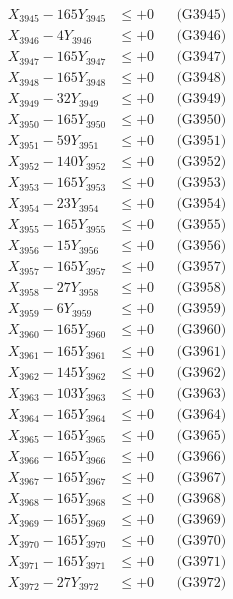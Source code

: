 \documentclass[a4paper,10pt]{article}
\begin{document}
{\begin{align}
X_{3945} - 165Y_{3945} &\leq +0 && \text{(G3945)} \\
X_{3946} - 4Y_{3946} &\leq +0 && \text{(G3946)} \\
X_{3947} - 165Y_{3947} &\leq +0 && \text{(G3947)} \\
X_{3948} - 165Y_{3948} &\leq +0 && \text{(G3948)} \\
X_{3949} - 32Y_{3949} &\leq +0 && \text{(G3949)} \\
X_{3950} - 165Y_{3950} &\leq +0 && \text{(G3950)} \\
\allowbreak
X_{3951} - 59Y_{3951} &\leq +0 && \text{(G3951)} \\
X_{3952} - 140Y_{3952} &\leq +0 && \text{(G3952)} \\
X_{3953} - 165Y_{3953} &\leq +0 && \text{(G3953)} \\
X_{3954} - 23Y_{3954} &\leq +0 && \text{(G3954)} \\
X_{3955} - 165Y_{3955} &\leq +0 && \text{(G3955)} \\
X_{3956} - 15Y_{3956} &\leq +0 && \text{(G3956)} \\
X_{3957} - 165Y_{3957} &\leq +0 && \text{(G3957)} \\
X_{3958} - 27Y_{3958} &\leq +0 && \text{(G3958)} \\
X_{3959} - 6Y_{3959} &\leq +0 && \text{(G3959)} \\
X_{3960} - 165Y_{3960} &\leq +0 && \text{(G3960)} \\
\allowbreak
X_{3961} - 165Y_{3961} &\leq +0 && \text{(G3961)} \\
X_{3962} - 145Y_{3962} &\leq +0 && \text{(G3962)} \\
X_{3963} - 103Y_{3963} &\leq +0 && \text{(G3963)} \\
X_{3964} - 165Y_{3964} &\leq +0 && \text{(G3964)} \\
X_{3965} - 165Y_{3965} &\leq +0 && \text{(G3965)} \\
X_{3966} - 165Y_{3966} &\leq +0 && \text{(G3966)} \\
X_{3967} - 165Y_{3967} &\leq +0 && \text{(G3967)} \\
X_{3968} - 165Y_{3968} &\leq +0 && \text{(G3968)} \\
X_{3969} - 165Y_{3969} &\leq +0 && \text{(G3969)} \\
X_{3970} - 165Y_{3970} &\leq +0 && \text{(G3970)} \\
\allowbreak
X_{3971} - 165Y_{3971} &\leq +0 && \text{(G3971)} \\
X_{3972} - 27Y_{3972} &\leq +0 && \text{(G3972)} \\

\end{align}}
\end{document}
